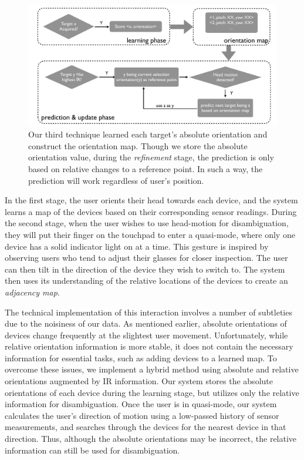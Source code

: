 \begin{figure}[t]
\centering
\includegraphics[width=1\columnwidth]{figures/third_technique3.pdf}
\caption{ Our third technique learned each target's absolute orientation and construct the orientation map. Though we store the absolute orientation value, during the {\em refinement} stage, the prediction is only based on relative changes to a reference point. In such a way, the prediction will work regardless of user's position.}
\label{fig:third_technique}
\end{figure}



In the first stage, the user orients their head towards each device, and the
system learns a map of the devices based on their corresponding sensor readings.
During the second stage, when the user wishes to use head-motion for
disambiguation, they will put their finger on the touchpad to enter a
quasi-mode, where only one device has a solid indicator light on at a time. This
gesture is inspired by observing users who tend to adjust their glasses for
closer inspection. The user can then tilt in the direction of the device they
wish to switch to. The system then uses its understanding of the relative
locations of the devices to create an {\em adjacency map}.

The technical implementation of this interaction involves a number of subtleties
due to the noisiness of our data. As mentioned earlier, absolute orientations
of devices change frequently at the slightest user movement. Unfortunately,
while relative orientation information is more stable, it does not contain
the necessary information for essential tasks, such as adding devices to a
learned map. To overcome these issues, we implement a hybrid method using
absolute and relative orientations augmented by IR information. Our system
stores the absolute orientations of each device during the learning stage, but
utilizes only the relative information for disambiguation. Once the user is in
quasi-mode, our system calculates the user's direction of motion using a
low-passed history of sensor measurements, and searches through the devices for
the nearest device in that direction. Thus, although the absolute orientations
may be incorrect, the relative information can still be used for disambiguation.

